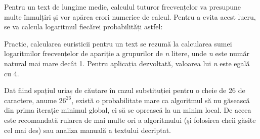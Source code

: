 \documentclass{article}
\begin{document}
\vspace{0.3cm}
\begin{center}
    \label{fig:1}
    \captionsetup{justification=centering,margin=1cm}
\end{center}
\vspace{0.3cm}

\begin{center}
    \label{fig:1}
    \captionsetup{justification=centering,margin=1cm}
\end{center}
\vspace{0.3cm}

Pentru un text de lungime medie, calculul tuturor frecvențelor va presupune multe înmulțiri și vor apărea erori numerice de calcul. Pentru a evita acest lucru, se va calcula logaritmul fiecărei probabilități astfel:

\vspace{0.3cm}
\begin{center}
\end{center}
\vspace{0.3cm}

Practic, calcularea euristicii pentru un text se rezumă la calcularea sumei logaritmilor frecvențelor de apariție a grupurilor de \textit{n} litere, unde \textit{n} este număr natural mai mare decât 1. Pentru aplicația dezvoltată, valoarea lui \textit{n} este egală cu 4.

Dat fiind spațiul uriaș de căutare în cazul substituției pentru o cheie de 26 de caractere, anume $26^{26}$, există o probabilitate mare ca algoritmul să nu găsească din prima iterație minimul global, ci să se oprească la un minim local. De aceea este recomandată rularea de mai multe ori a algoritmului (și folosirea cheii găsite cel mai des) sau analiza manuală a textului decriptat. 
\end{document}
